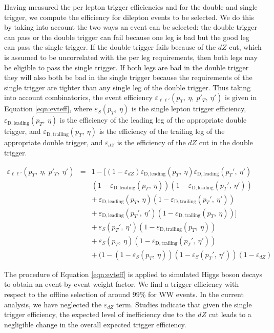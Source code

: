 Having measured the per lepton trigger efficiencies 
and for the double and single trigger,
we compute the efficiency for dilepton events to be selected.
We do this by taking into account the two ways an event can be selected: 
the double trigger can pass or the double trigger can fail because one leg is bad
but the good leg can pass the single trigger.  If the double trigger fails
because of the $dZ$ cut, which is assumed to be uncorrelated with the per leg requirements,
then both legs may be eligible to pass the single trigger. 
If both legs are bad in the double trigger they will also both be bad in the single trigger
because the requirements of the single trigger are tighter than any single leg of the double trigger.
Thus taking into account combinatorics, the event efficiency $\varepsilon_{\ell\ell'}(p_T,\:\eta,\:p'_T,\:\eta')$
is given in Equation \ref{eqn:evteff}, where $\varepsilon_{S}(p_T,\:\eta)$ is the single 
lepton trigger efficiency,
$\varepsilon_{\mathrm{D,leading}}(p_T,\:\eta)$ is the efficiency of the leading leg of the 
appropriate double trigger, and $\varepsilon_{\mathrm{D,trailing}}(p_T,\:\eta)$ is the 
efficiency of the trailing leg of the appropriate double trigger, and $\varepsilon_{dZ}$ is the efficiency
of the $dZ$ cut in the double trigger.

\begin{eqnarray}
\label{eqn:evteff}
\varepsilon_{\ell\ell'}(p_T,\:\eta,\:p'_T,\:\eta') & = & 1 - [(1-\varepsilon_{dZ})\varepsilon_{\mathrm{D,leading}}(p_T,\:\eta)\varepsilon_{\mathrm{D,leading}}(p_T',\:\eta') \\
               &   & (1-\varepsilon_{\mathrm{D,leading}}(p_T,\:\eta))(1-\varepsilon_{\mathrm{D,leading}}(p_T',\:\eta')) \\
               &   & +~\varepsilon_{\mathrm{D,leading}}(p_T,\:\eta)(1-\varepsilon_{\mathrm{D,trailing}}(p_T',\:\eta')) \\
               &   & +~\varepsilon_{\mathrm{D,leading}}(p_T',\:\eta')(1-\varepsilon_{\mathrm{D,trailing}}(p_T,\:\eta))] \\
               &   & +~\varepsilon_{S}(p_T',\:\eta')(1-\varepsilon_{\mathrm{D,trailing}}(p_T,\:\eta)) \nonumber\\
               &   & +~\varepsilon_{S}(p_T,\:\eta)(1-\varepsilon_{\mathrm{D,trailing}}(p_T',\:\eta')) \\
               &   & +~(1-(1-\varepsilon_{S}(p_T,\:\eta))(1-\varepsilon_{S}(p_T',\:\eta'))(1-\varepsilon_{dZ})
\end{eqnarray}

The procedure of Equation \ref{eqn:evteff} is applied to simulated Higgs boson decays to obtain an event-by-event weight factor. We find a 
trigger efficiency with respect to the offline selection of around $99\%$ for WW events.
In the current analysis, we have neglected the $\varepsilon_{dZ}$ term.  Studies indicate that given the single trigger efficiency,
the expected level of inefficiency due to the $dZ$ cut leads to a negligible change in the overall expected trigger efficiency.


